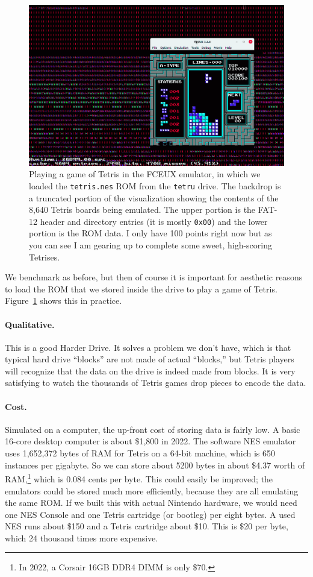 \documentclass[twocolumn]{article}
\begin{document}
\begin{figure}
  \centering
  \includegraphics[width=\columnwidth]{tetru-playing}
  \caption{ Playing a game of Tetris in the FCEUX emulator, in which
    we loaded the {\tt tetris.nes} ROM from the {\tt tetru} drive. The
    backdrop is a truncated portion of the visualization showing the
    contents of the 8,640 Tetris boards being emulated. The upper
    portion is the FAT-12 header and directory entries (it is mostly
    {\tt 0x00}) and the lower portion is the ROM data. I only have 100
    points right now but as you can see I am gearing up to complete
    some sweet, high-scoring Tetrises. } \label{fig:tetru-playing}
\end{figure}

We benchmark as before, but then of course it is important for
aesthetic reasons to load the ROM that we stored inside the drive
to play a game of Tetris. Figure~\ref{fig:tetru-playing} shows
this in practice.

\paragraph{Qualitative.} This is a good Harder Drive. It solves a problem
we don't have, which is that typical hard drive ``blocks'' are not made
of actual ``blocks,'' but Tetris players will recognize that the data on
the drive is indeed made from blocks. It is very satisfying to watch
the thousands of Tetris games drop pieces to encode the data.

\paragraph{Cost.} Simulated on a computer, the up-front cost of storing
data is fairly low. A basic 16-core desktop computer is about \$1,800
in 2022. The software NES emulator uses 1,652,372 bytes of RAM for
Tetris on a 64-bit machine, which is 650 instances per gigabyte. So we
can store about 5200 bytes in about \$4.37 worth of RAM,\footnote{ In
  2022, a Corsair 16GB DDR4 DIMM is only \$70. } which is 0.084 cents
per byte. This could easily be improved; the emulators could be stored
much more efficiently, because they are all emulating the same ROM. If
we built this with actual Nintendo hardware, we would need one NES
Console and one Tetris cartridge (or bootleg) per eight bytes. A used
NES runs about \$150 and a Tetris cartridge about \$10. This is
\$20 per byte, which 24 thousand times more expensive.
\end{document}

